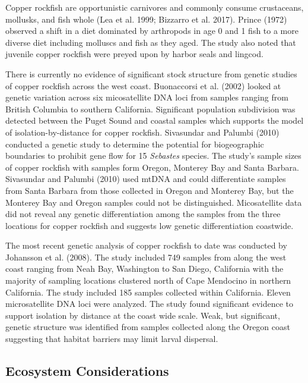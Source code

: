 \documentclass[11pt,
  english,
  letterpaper,
]{article}
\begin{document}
Copper rockfish are opportunistic carnivores and commonly consume crustaceans, mollusks, and fish whole (Lea et al. 1999; Bizzarro et al. 2017). Prince (1972) observed a shift in a diet dominated by arthropods in age 0 and 1 fish to a more diverse diet including molluscs and fish as they aged. The study also noted that juvenile copper rockfish were preyed upon by harbor seals and lingcod.

There is currently no evidence of significant stock structure from genetic studies of copper rockfish across the west coast. Buonaccorsi et al. (2002) looked at genetic variation across six micosatellite DNA loci from samples ranging from British Columbia to southern California. Significant population subdivision was detected between the Puget Sound and coastal samples which supports the model of isolation-by-distance for copper rockfish. Sivasundar and Palumbi (2010) conducted a genetic study to determine the potential for biogeographic boundaries to prohibit gene flow for 15 \emph{Sebastes} species. The study's sample sizes of copper rockfish with samples form Oregon, Monterey Bay and Santa Barbara. Sivasundar and Palumbi (2010) used mtDNA and could differentiate samples from Santa Barbara from those collected in Oregon and Monterey Bay, but the Monterey Bay and Oregon samples could not be distinguished. Micosatellite data did not reveal any genetic differentiation among the samples from the three locations for copper rockfish and suggests low genetic differentiation coastwide.

The most recent genetic analysis of copper rockfish to date was conducted by Johansson et al. (2008). The study included 749 samples from along the west coast ranging from Neah Bay, Washington to San Diego, California with the majority of sampling locations clustered north of Cape Mendocino in northern California. The study included 185 samples collected within California. Eleven microsatellite DNA loci were analyzed. The study found significant evidence to support isolation by distance at the coast wide scale. Weak, but significant, genetic structure was identified from samples collected along the Oregon coast suggesting that habitat barriers may limit larval dispersal.

\hypertarget{ecosystem-considerations-1}{%
\subsection{Ecosystem Considerations}\label{ecosystem-considerations-1}}
\end{document}
